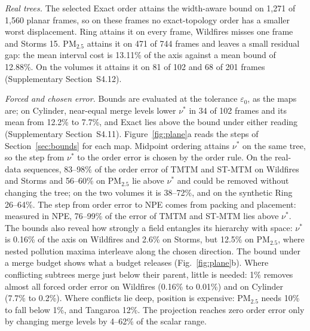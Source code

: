 \emph{Real trees.} The selected Exact order attains the width-aware bound on 1,271 of 1,560 planar frames, so on these frames no exact-topology order has a smaller worst displacement. Ring attains it on every frame, Wildfires misses one frame and Storms 15. PM$_{2.5}$ attains it on 471 of 744 frames and leaves a small residual gap: the mean interval cost is 13.11\% of the axis against a mean bound of 12.88\%. On the volumes it attains it on 81 of 102 and 68 of 201 frames (Supplementary Section~S4.12).

\emph{Forced and chosen error.} Bounds are evaluated at the tolerance $\varepsilon_0$, as the maps are; on Cylinder, near-equal merge levels lower $\nu^*$ in 34 of 102 frames and its mean from 12.2\% to 7.7\%, and Exact lies above the bound under either reading (Supplementary Section~S4.11). Figure~\ref{fig:plane}a reads the steps of Section~\ref{sec:bounds} for each map. Midpoint ordering attains $\nu^*$ on the same tree, so the step from $\nu^*$ to the order error is chosen by the order rule. On the real-data sequences, 83--98\% of the order error of TMTM and ST-MTM on Wildfires and Storms and 56--60\% on PM$_{2.5}$ lie above $\nu^*$ and could be removed without changing the tree; on the two volumes it is 38--72\%, and on the synthetic Ring 26--64\%. The step from order error to NPE comes from packing and placement: measured in NPE, 76--99\% of the error of TMTM and ST-MTM lies above $\nu^*$. The bounds also reveal how strongly a field entangles its hierarchy with space: $\nu^*$ is 0.16\% of the axis on Wildfires and 2.6\% on Storms, but 12.5\% on PM$_{2.5}$, where nested pollution maxima interleave along the chosen direction. The bound under a merge budget shows what a budget releases (Fig.~\ref{fig:plane}b). Where conflicting subtrees merge just below their parent, little is needed: 1\% removes almost all forced order error on Wildfires (0.16\% to 0.01\%) and on Cylinder (7.7\% to 0.2\%). Where conflicts lie deep, position is expensive: PM$_{2.5}$ needs 10\% to fall below 1\%, and Tangaroa 12\%. The projection reaches zero order error only by changing merge levels by 4--62\% of the scalar range.

